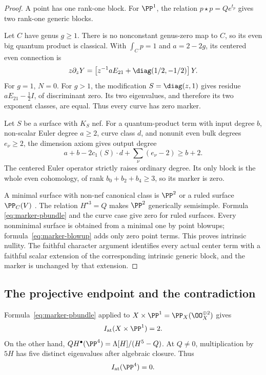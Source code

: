 \begin{proof}
A point has one rank-one block.  For \(\PP^1\), the relation
\(p\star p=Qe^{t_p}\) gives two rank-one generic blocks.

Let \(C\) have genus \(g\ge1\).  There is no nonconstant genus-zero map to
\(C\), so its even big quantum product is classical.  With
\(\int_Cp=1\) and \(a=2-2g\), its centered even connection is
\[
 z\partial_zY=
 \left[z^{-1}aE_{21}+\diag(1/2,-1/2)\right]Y.
\]
For \(g=1\), \(N=0\).  For \(g>1\), the modification
\(S=\diag(z,1)\) gives residue \(aE_{21}-\tfrac12I\), of discriminant zero.
Its two eigenvalues, and therefore its two exponent classes, are equal.  Thus
every curve has zero marker.

Let \(S\) be a surface with \(K_S\) nef.  For a quantum-product term with
input degree \(b\), non-scalar Euler degree \(a\ge2\), curve class \(d\), and
nonunit even bulk degrees \(e_\nu\ge2\), the dimension axiom gives output
degree
\[
 a+b-2c_1(S)\cdot d+\sum_\nu(e_\nu-2)\ge b+2.
\]
The centered Euler operator strictly raises ordinary degree.  Its only block
is the whole even cohomology, of rank \(b_0+b_2+b_4\ge3\), so its marker is
zero.

A minimal surface with non-nef canonical class is \(\PP^2\) or a ruled
surface \(\PP_C(V)\) \cite[Chapter~VI]{BeauvilleSurfaces}.  The relation
\(H^{\star3}=Q\) makes \(\PP^2\) generically semisimple.  Formula
\eqref{eq:marker-pbundle} and the curve case give zero for ruled surfaces.
Every nonminimal surface is obtained from a minimal one by point blowups;
formula~\eqref{eq:marker-blowup} adds only zero point terms.  This proves
intrinsic nullity.  The faithful character argument identifies every actual
center term with a faithful scalar extension of the corresponding intrinsic
generic block, and the marker is unchanged by that extension.
\end{proof}

\subsection{The projective endpoint and the contradiction}

Formula~\eqref{eq:marker-pbundle} applied to
\(X\times\PP^1=\PP_X(\OO_X^{\oplus2})\) gives
\begin{equation}
 I_{\mathrm{at}}(X\times\PP^1)=2.
 \label{eq:atomic-product-value}
\end{equation}
On the other hand,
\(QH^\bullet(\PP^4)=\Lambda[H]/(H^5-Q)\).  At \(Q\ne0\), multiplication
by \(5H\) has five distinct eigenvalues after algebraic closure.  Thus
\begin{equation}
 I_{\mathrm{at}}(\PP^4)=0.
 \label{eq:atomic-projective-value}
\end{equation}

